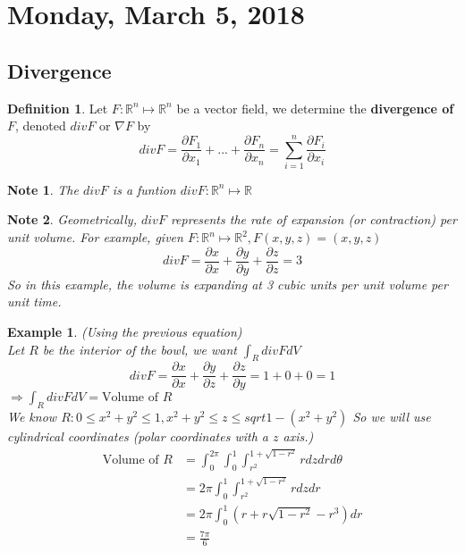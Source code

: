 \documentclass[12pt]{article}
\theoremstyle{plain}
\newtheorem*{note}{Note}
\newtheorem{example}[theorem]{Example}
\theoremstyle{definition}
\newtheorem{definition}[theorem]{Definition}
\begin{document}
\section{Monday, March 5, 2018}

\subsection{Divergence}

\begin{definition}
	Let $F : \mathbb{R}^n \mapsto \mathbb{R}^n$ be a vector field, we determine the \textbf{divergence of $F$}, denoted $div F$ or $\nabla F$ by
	$$div F = \frac{\partial F_1}{\partial x_1} + ... + \frac{\partial F_n}{\partial x_n} = \sum_{i=1}^n \frac{\partial F_i}{\partial x_i}$$
\end{definition}

\begin{note}
		The $div F$ is a funtion $div F : \mathbb{R}^n \mapsto \mathbb{R}$
\end{note}
\begin{note}
	Geometrically, $div F$ represents the rate of expansion (or contraction) per unit volume. For example, given $F:\mathbb{R}^n \mapsto \mathbb{R}^2, F(x,y,z) = (x,y,z)$
	$$div F = \frac{\partial x}{\partial x} + \frac{\partial y}{\partial y} + \frac{\partial z}{\partial z} = 3$$
	So in this example, the volume is expanding at 3 cubic units per unit volume per unit time.
\end{note}

\begin{example}
	(Using the previous equation)\\
	Let $R$ be the interior of the bowl, we want $\int_R div F dV$
	$$div F = \frac{\partial x}{\partial x} + \frac{\partial y}{\partial z} + \frac{\partial z}{\partial y} = 1 + 0 + 0 = 1$$
	$\Longrightarrow \int_R div F dV = \text{Volume of $R$}$\\
	We know $R : 0 \leq x^2 + y^2 \leq 1, x^2 + y^2 \leq z \leq sqrt{1 - (x^2 + y^2)}$
	So we will use cylindrical coordinates (polar coordinates with a $z$ axis.)
	\begin{align*}
		\text{Volume of $R$} &=  \int_0^{2\pi} \int^1_0 \int^{1+\sqrt{1-r^2}}_{r^2} rdzdrd\theta\\
		&= 2\pi  \int^1_0 \int^{1+\sqrt{1-r^2}}_{r^2} r dzdr\\
		&=  2\pi  \int^1_0 (r+ r\sqrt{1-r^2} - r^3)dr\\
		&= \frac{7\pi}{6}
	\end{align*}
\end{example}
\end{document}
